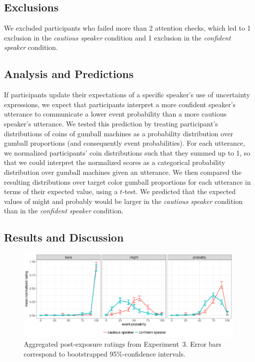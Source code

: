 \documentclass[man, floatsintext]{apa6}
\begin{document}
\subsection{Exclusions}

We excluded participants who failed more than 2 attention checks, which led to 1 exclusion in the \emph{cautious speaker} condition and 1 exclusion in the \emph{confident speaker} condition.


\subsection{Analysis and Predictions}

If participants update their expectations of a specific speaker's use of uncertainty expressions,  we expect that participants interpret a more confident speaker's utterance 
to communicate a lower event probability than a more cautious speaker's utterance. We tested this prediction by treating participant's distributions of coins 
of gumball machines as a probability distribution over gumball proportions (and consequently event probabilities).  For each utterance, we 
normalized participants' coin distributions such that they summed up to 1, so that we could interpret the normalized scores 
as a categorical probability distribution over gumball machines given an utterance. We then compared the resulting distributions
over target color gumball proportions for each utterance in terms of their expected value, using a $t$-test.
 We predicted that the expected values of 
{\sc might} and {\sc probably} would be larger in the \emph{cautious speaker} condition than in the \emph{confident speaker} condition.

\subsection{Results and Discussion}

\begin{figure}
\includegraphics[width=\textwidth]{plots/exp-2-ratings.pdf}
\caption{Aggregated post-exposure ratings from Experiment~3. Error bars correspond to bootstrapped 95\%-confidence intervals.  \label{fig:adaptation-results-comp}}
\end{figure}
\end{document}
